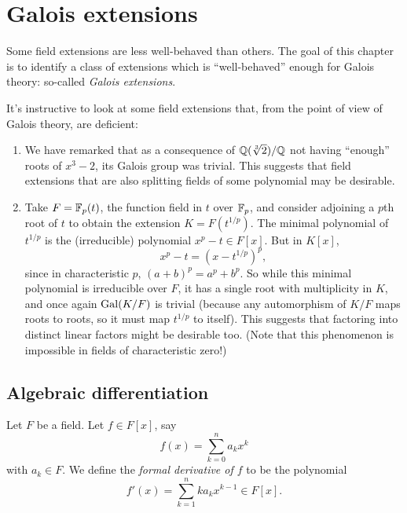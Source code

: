 \chapter{Galois extensions}

Some field extensions are less well-behaved than others. The goal of this chapter is to identify a class of extensions which is ``well-behaved'' enough for Galois theory: so-called \emph{Galois extensions}.

\begin{example}
\label{exmp_non_gal_exts}
    It's instructive to look at some field extensions that, from the point of view of Galois theory, are deficient:
    \begin{enumerate}
        \item We have remarked that as a consequence of $\mathbb{{Q}}(\sqrt[3]{2})/\mathbb{{Q}}$ not having ``enough'' roots of $x^3 - 2$, its Galois group was trivial. This suggests that field extensions that are also splitting fields of some polynomial may be desirable.
        \item Take $F = \mathbb{{F}}_p(t)$, the function field in $t$ over $\mathbb{{F}}_p$, and consider adjoining a $p$th root of $t$ to obtain the extension $K = F(t^{1/p})$. The minimal polynomial of $t^{1/p}$ is the (irreducible) polynomial $x^p - t \in F[x]$. But in $K[x]$, 
        \[
            x^p - t = \left(x - t^{1/p}\right)^p,
        \]
        since in characteristic $p$, $(a + b)^p = a^p + b^p$. So while this minimal polynomial is irreducible over $F$, it has a single root with multiplicity in $K$, and once again $\operatorname{Gal}(K/F)$ is trivial (because any automorphism of $K/F$ maps roots to roots, so it must map $t^{1/p}$ to itself). This suggests that factoring into distinct linear factors might be desirable too. (Note that this phenomenon is impossible in fields of characteristic zero!)
    \end{enumerate}
\end{example}

\section{Algebraic differentiation}

\begin{definition}
    Let $F$ be a field. Let $f \in F[x]$, say
    \[
        f(x) = \sum_{k = 0}^{n} a_k x^k
    \]
    with $a_k \in F$. We define the \emph{formal derivative of $f$} to be the polynomial
    \[
        f'(x) = \sum_{k = 1}^{n} k a_k x^{k - 1} \in F[x].
    \]
\end{definition}

